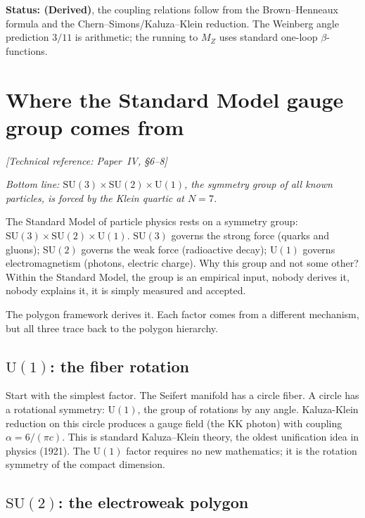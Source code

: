 \textbf{Status: (Derived)}, the coupling relations follow from the
Brown--Henneaux formula and the Chern--Simons/Kaluza--Klein reduction.
The Weinberg angle prediction $3/11$ is arithmetic; the running to
$M_Z$ uses standard one-loop $\beta$-functions.


\section{Where the Standard Model gauge group comes from}
\noindent\textit{[Technical reference: Paper~IV, \S6--8]}

\medskip

\noindent\textit{Bottom line: $\mathrm{SU}(3) \times \mathrm{SU}(2)
\times \mathrm{U}(1)$, the symmetry group of all known
particles, is forced by the Klein quartic at $N = 7$.}

\medskip

The Standard Model of particle physics rests on a symmetry group:
$\mathrm{SU}(3) \times \mathrm{SU}(2) \times \mathrm{U}(1)$.
$\mathrm{SU}(3)$ governs the strong force (quarks and gluons);
$\mathrm{SU}(2)$ governs the weak force (radioactive decay);
$\mathrm{U}(1)$ governs electromagnetism (photons, electric charge).
Why this group and not some other? Within the Standard Model, the
group is an empirical input, nobody derives it, nobody explains it,
it is simply measured and accepted.

The polygon framework derives it. Each factor comes from a different
mechanism, but all three trace back to the polygon hierarchy.

\subsection*{$\mathrm{U}(1)$: the fiber rotation}

Start with the simplest factor. The Seifert manifold has a circle fiber.
A circle has a rotational symmetry: $\mathrm{U}(1)$, the group of
rotations by any angle. Kaluza-Klein reduction on this circle
produces a gauge field (the KK photon) with coupling
$\alpha = 6/(\pi c)$. This is standard Kaluza--Klein theory, the
oldest unification idea in physics (1921). The $\mathrm{U}(1)$ factor
requires no new mathematics; it is the rotation symmetry of the
compact dimension.

\subsection*{$\mathrm{SU}(2)$: the electroweak polygon}


